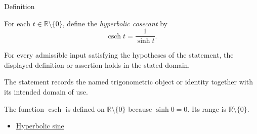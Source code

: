 

\begin{definitionbox}{Definition}
\begin{definition}
\label{def:hyperbolic-cosecant}
For each $t\in\mathbb{R}\setminus\{0\}$, define the \emph{hyperbolic
cosecant} by
\[
  \operatorname{csch} t=\frac{1}{\sinh t}.
\]
\end{definition}
\end{definitionbox}
\begin{remark*}
For every admissible input satisfying the hypotheses of the statement, the
displayed definition or assertion holds in the stated domain.
\end{remark*}

\begin{remark*}[Interpretation]
The statement records the named trigonometric object or identity together with
its intended domain of use.
\end{remark*}

\begin{remark*}
The function $\operatorname{csch}$ is defined on
$\mathbb{R}\setminus\{0\}$ because $\sinh 0=0$. Its range is
$\mathbb{R}\setminus\{0\}$.
\end{remark*}
\begin{dependencies}
\begin{itemize}
  \item \hyperref[def:hyperbolic-sine]{Hyperbolic sine}
\end{itemize}
\end{dependencies}
